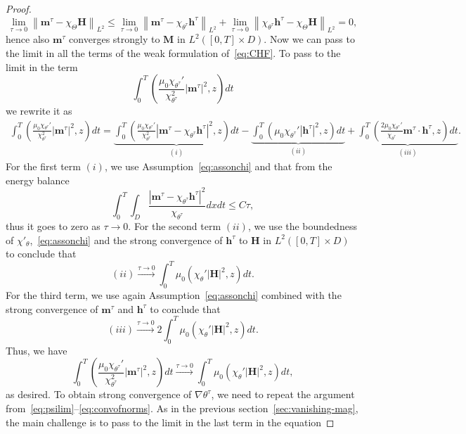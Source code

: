 \documentclass[10pt,letterpaper,twoside]{amsart}
\theoremstyle{definition}{\newtheorem{definition}[lemma]{Definition}}
\theoremstyle{note}{\newtheorem{claim}{Claim}[section]
\newtheorem*{claim*}{Claim}}
\numberwithin{equation}{section}
\newcommand{\dom}{D}
\newcommand{\norm}[1]{\left\| #1 \right\|}
\newcommand{\Grad}{\nabla}
\newcommand{\Bm}{\mathbf{M}}
\newcommand{\Bh}{\mathbf{H}}
\newcommand{\bmt}{\mathbf{m}^{\tau}}
\newcommand{\bht}{\mathbf{h}^{\tau}}
\newcommand{\tht}{\theta^{\tau}}
\begin{document}
\begin{proof}
\begin{equation*}
		\lim_{\tau\to 0}\norm{\bmt-\chi_{\Theta}\Bh}_{L^2}\leq \lim_{\tau\to 0} \norm{\bmt -\chi_{\tht}\bht}_{L^2}+\lim_{\tau\to 0}\norm{\chi_{\tht} \bht - \chi_{\Theta}\Bh}_{L^2} =0,
	\end{equation*}
	hence also $\bmt$ converges strongly to $\Bm$ in $L^2([0,T]\times\dom)$. Now we can pass to the limit in all the terms of the weak formulation of~\eqref{eq:CHF}. To pass to the limit in the term
	\begin{equation*}
	\int_0^T\left(	\frac{\mu_0 \chi_{\tht}'}{\chi_{\tht}^2}|\bmt|^2, z\right)dt
	\end{equation*}
	we rewrite it as
	\begin{multline*}
			\int_0^T\left(	\frac{\mu_0 \chi_{\tht}'}{\chi_{\tht}^2}|\bmt|^2, z\right)dt = 	\underbrace{\int_0^T\left(	\frac{\mu_0 \chi_{\tht}'}{\chi_{\tht}^2}|\bmt-\chi_{\tht}\bht|^2, z\right)dt }_{(i)}- \underbrace{\int_0^T\left(	 {\mu_0 \chi_{\tht}'} | \bht|^2, z\right)dt}_{(ii)} 
			 + 	\underbrace{\int_0^T\left(	\frac{2\mu_0 \chi_{\tht}'}{\chi_{\tht}}\bmt\cdot\bht, z\right)dt }_{(iii)}.
	\end{multline*}
	For the first term $(i)$, we use Assumption~\eqref{eq:assonchi} and that from the energy balance
	\begin{equation}\label{eq:tauest}
		\int_0^T\int_{\dom} \frac{\left|\bmt-\chi_{\tht}\bht\right|^2 }{\chi_{\tht}}dx dt\leq C \tau,
	\end{equation}
	thus it goes to zero as $\tau\to 0$. For the second term $(ii)$, we use the boundedness of $\chi'_\theta$,~\eqref{eq:assonchi} and the strong convergence of $\bht$ to $\Bh$ in $L^2([0,T]\times\dom)$ to conclude that
	\begin{equation*}
		(ii)\stackrel{\tau\to 0}{\longrightarrow}\int_0^T\mu_0(\chi_\theta' |\Bh|^2,z)dt.
	\end{equation*}
	For the third term, we use again Assumption~\eqref{eq:assonchi} combined with the strong convergence of $\bmt$ and $\bht$ to conclude that
	\begin{equation*}
		(iii)\stackrel{\tau\to 0}{\longrightarrow}2\int_0^T\mu_0(\chi_\theta' |\Bh|^2,z)dt.
	\end{equation*}
	Thus, we have
	\begin{equation*}
			\int_0^T\left(	\frac{\mu_0 \chi_{\tht}'}{\chi_{\tht}^2}|\bmt|^2, z\right)dt \stackrel{\tau\to 0}{\longrightarrow}\int_0^T\mu_0(\chi_\theta' |\Bh|^2,z)dt,
	\end{equation*}
	as desired. To obtain strong convergence of $\Grad\tht$, we need to repeat the argument from~\eqref{eq:psilim}--\eqref{eq:convofnorms}. As in the previous section~\ref{sec:vanishing-mag}, the main challenge is to pass to the limit in the last term in the equation 

\end{proof}
\end{document}
